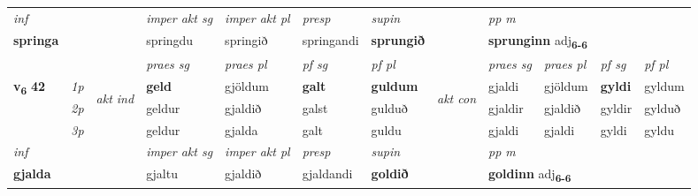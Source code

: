 \begin{longtable}[l]{X>{\footnotesize\itshape}llXXXXlXXXX}
   {\textit{inf}} & &  & \textit{imper akt sg} & \textit{imper akt pl}   & \textit{presp} & \textit{supin}  && \textit{pp m} \\*
  {\textbf{springa}} & && springdu  & springið   & springandi &  \textbf{sprungið}  && \multicolumn{2}{l}{\textbf{sprunginn} adj\textbf{\textsubscript{6-6}}} \\*

\midrule

 & &   & \textit{praes sg}  & \textit{praes pl}    & \textit{ pf sg} & \textit{pf pl} & & \textit{praes sg}  & \textit{praes pl}    & \textit{pf sg} & \textit{pf pl }  \\ \cmidrule{4-7} \cmidrule{9-12}
 \multirow{2}{*}{{{\textbf{v{\textsubscript{6}}} \Large{\textbf{42}}}}}  & 1p & \multirow{3}{*}{\begin{turn}{90}\textit{akt ind}\end{turn}} & \textbf{geld} & gjöldum & \textbf{galt} & \textbf{guldum} & \multirow{3}{*}{\begin{turn}{90}\textit{akt con}\end{turn}} &gjaldi & gjöldum & \textbf{gyldi} & gyldum\\*
 & 2p &  &  geldur  & gjaldið & galst & gulduð & & gjaldir & gjaldið & gyldir & gylduð \\*
 & 3p &  & geldur & gjalda & galt & guldu & & gjaldi & gjaldi& gyldi & gyldu \\*
\cmidrule{4-7} \cmidrule{9-12}

   {\textit{inf}} & &  & \textit{imper akt sg} & \textit{imper akt pl}   & \textit{presp} & \textit{supin}  && \textit{pp m} \\*
  {\textbf{gjalda}} & && gjaltu  & gjaldið   & gjaldandi &  \textbf{goldið}  && \multicolumn{2}{l}{\textbf{goldinn} adj\textbf{\textsubscript{6-6}}} \\*

\midrule


\end{longtable}
